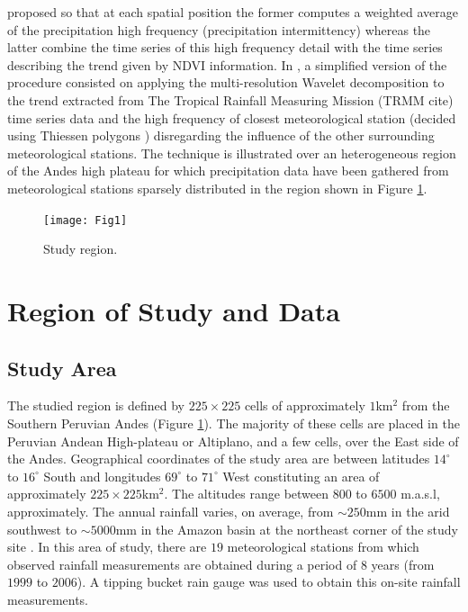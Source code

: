 \documentclass[10pt,letterpaper,conference]{ieeeconf}
\begin{document}
proposed so that at each spatial position the former computes a weighted average 
of the precipitation high frequency (precipitation intermittency) whereas the 
latter combine the time series of this high frequency detail with the time 
series describing the trend given by NDVI information. In 
\cite{Heidinger-et-al_2012,Quiroz-et-al_2011}, a simplified version of the 
procedure consisted on applying the multi-resolution Wavelet 
decomposition to the trend extracted from  The Tropical Rainfall Measuring 
Mission (TRMM cite{}) time series data and the high frequency 
of closest meteorological station (decided using Thiessen polygons 
\cite{Voronoi_1908}) disregarding the influence of the other surrounding 
meteorological stations.  The technique is illustrated over an heterogeneous 
region of the Andes high plateau for which precipitation data have been gathered 
from meteorological stations sparsely distributed in the region shown in Figure 
\ref{fig:study_area}.
\begin{figure}[ht]
\begin{center}
\texttt{[image: Fig1]}
\vspace*{-0.1in}
\caption{Study region.}
\label{fig:study_area}
\end{center}
\end{figure}


\section{Region of Study and Data} \label{sec:2}

\subsection{Study Area} \label{subsec:2_1}

The studied region is defined by $225\times225$ cells of approximately 
$1$km$^2$  from  the Southern Peruvian Andes (Figure \ref{fig:study_area}). The 
majority of these cells are placed in the Peruvian Andean High-plateau or 
Altiplano, and a few cells, over the East side of the Andes. Geographical 
coordinates of the study area are between latitudes $14^\circ$ to $16^\circ$ 
South and longitudes $69^\circ$ to $71^\circ$ West {constituting an area of 
approximately $225\times 225${km}$^2$}. The altitudes range between $800$ 
to $6500$ {m.a.s.l}, approximately. The annual rainfall varies, on 
average, from $\sim 250${mm} in the arid southwest to $\sim 5000${mm} in the 
Amazon basin at the northeast corner of the study site 
\cite{Garreaud-et-al_2003}. {In this area of study, there are $19$ 
meteorological stations from which observed rainfall measurements are obtained 
during a period of $8$ years (from $1999$ to $2006$). A tipping bucket rain 
gauge was used to obtain this on-site rainfall measurements.} 
\end{document}
